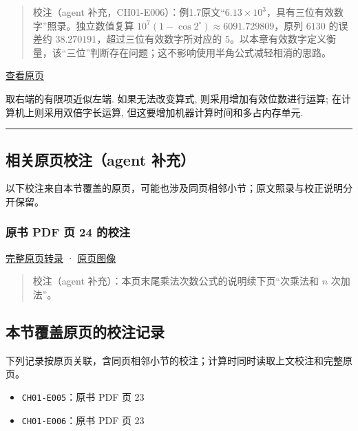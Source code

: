 \documentclass[
  10pt,
  fontset=fandol]{ctexart}
\providecommand{\tightlist}{%
  \setlength{\itemsep}{0pt}\setlength{\parskip}{0pt}}
\begin{document}
\begin{quote}
校注（agent 补充，CH01-E006）：例1.7原文``\(6.13\times10^3\)，具有三位有效数字''照录。独立数值复算 \(10^7(1-\cos2^\circ)\approx6091.729809\)，原列 \(6130\) 的误差约 \(38.270191\)，超过三位有效数字所对应的 \(5\)。以本章有效数字定义衡量，该``三位''判断存在问题；这不影响使用半角公式减轻相消的思路。
\end{quote}

\href{../../source-images/pdf-024.jpeg}{查看原页}

取右端的有限项近似左端. 如果无法改变算式, 则采用增加有效位数进行运算; 在计算机上则采用双倍字长运算, 但这要增加机器计算时间和多占内存单元.

\begin{center}\rule{0.5\linewidth}{0.5pt}\end{center}

\subsection{相关原页校注（agent 补充）}\label{ux76f8ux5173ux539fux9875ux6821ux6ce8agent-ux8865ux5145}

以下校注来自本节覆盖的原页，可能也涉及同页相邻小节；原文照录与校正说明分开保留。

\subsubsection{原书 PDF 页 24 的校注}\label{ux539fux4e66-pdf-ux9875-24-ux7684ux6821ux6ce8}

\href{../pages/pdf-024.md}{完整原页转录} · \href{../../source-images/pdf-024.jpeg}{原页图像}

\begin{quote}
校注（agent 补充）：本页末尾乘法次数公式的说明续下页``次乘法和 \(n\) 次加法''。
\end{quote}

\subsection{本节覆盖原页的校注记录}\label{ux672cux8282ux8986ux76d6ux539fux9875ux7684ux6821ux6ce8ux8bb0ux5f55}

下列记录按原页关联，含同页相邻小节的校注；计算时同时读取上文校注和完整原页。

\begin{itemize}
\tightlist
\item
  \texttt{CH01-E005}：原书 PDF 页 23
\item
  \texttt{CH01-E006}：原书 PDF 页 23
\end{itemize}
\end{document}
